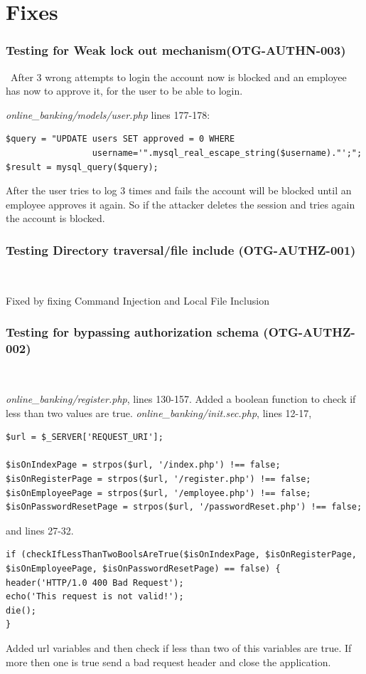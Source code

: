 \documentclass[headsepline,footsepline,footinclude=false,oneside,fontsize=11pt,paper=a4,listof=totoc,bibliography=totoc]{scrbook} %
\begin{document}
\chapter{Fixes}

\subsection{Testing for Weak lock out mechanism(OTG-AUTHN-003)}\
After 3 wrong attempts to login the account now is blocked and an employee has now to approve it, for the user to be able to login. \

\textit{online\_banking/models/user.php} lines 177-178:\\

\begin{lstlisting} 
$query = "UPDATE users SET approved = 0 WHERE 
                 username='".mysql_real_escape_string($username)."';"; 
$result = mysql_query($query);
\end{lstlisting} 
After the user tries to log 3 times and fails the account will be blocked until an employee approves it again. So if the attacker deletes the session and tries again the account is blocked.\\


\subsection{Testing Directory traversal/file include (OTG-AUTHZ-001)}\

Fixed by fixing Command Injection and Local File Inclusion

\pagebreak
\subsection{Testing for bypassing authorization schema (OTG-AUTHZ-002)}\

\textit{online\_banking/register.php}, lines 130-157. Added a boolean function to check if less than two values are true.
\textit{online\_banking/init.sec.php}, lines 12-17, 
\begin{lstlisting}
$url = $_SERVER['REQUEST_URI'];

$isOnIndexPage = strpos($url, '/index.php') !== false;
$isOnRegisterPage = strpos($url, '/register.php') !== false;
$isOnEmployeePage = strpos($url, '/employee.php') !== false;
$isOnPasswordResetPage = strpos($url, '/passwordReset.php') !== false;
\end{lstlisting} 
and lines 27-32. 
\begin{lstlisting}
if (checkIfLessThanTwoBoolsAreTrue($isOnIndexPage, $isOnRegisterPage, $isOnEmployeePage, $isOnPasswordResetPage) == false) {
header('HTTP/1.0 400 Bad Request');
echo('This request is not valid!');
die();
}
\end{lstlisting} 
Added url variables and then check if less than two of this variables are true. If more then one is true send a bad request header and close the application.
\pagebreak
\end{document}
